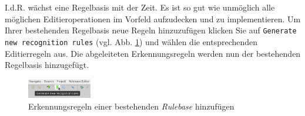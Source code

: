 I.d.R. wächst eine Regelbasis mit der Zeit. 
Es ist so gut wie unmöglich alle möglichen Editieroperationen im Vorfeld aufzudecken und zu implementieren. 
Um Ihrer bestehenden Regelbasis neue Regeln hinzuzufügen klicken Sie auf \texttt{Generate new recognition rules} (vgl. Abb. \ref{silift-rulebase_manager_create_new_rules}) und wählen die entsprechenden Editierregeln aus. 
Die abgeleiteten Erkennungsregeln werden nun der bestehenden Regelbasis hinzugefügt.

\begin{figure}[H]
\centering
\includegraphics[width=0.25\textwidth]{recognitionrules/graphics/silift-rulebase_manager_create_new_rules.png}
\caption{Erkennungsregeln einer bestehenden \textit{Rulebase} hinzufügen}
\label{silift-rulebase_manager_create_new_rules}
\end{figure}
